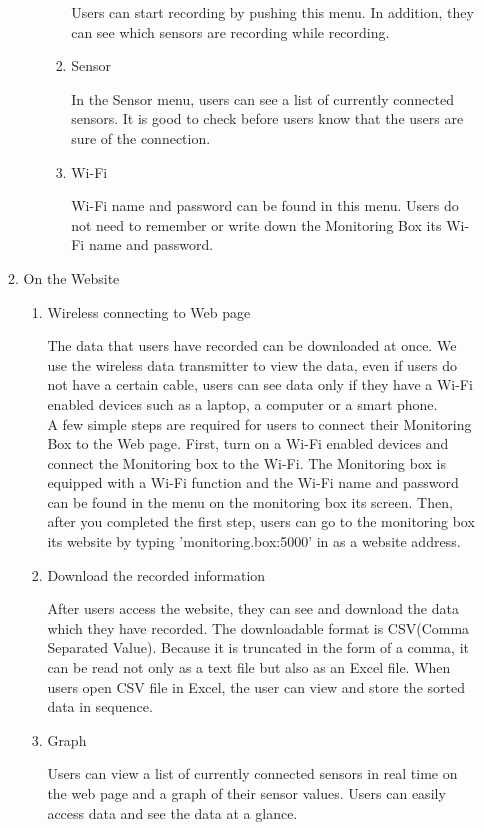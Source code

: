 \documentclass[conference]{IEEEtran}
\begin{document}
\begin{enumerate}
\begin{enumerate}
\begin{enumerate}
\begin{enumerate}
						Users can start recording by pushing this menu. In addition, they can see which sensors are recording while recording.\\
					\item Sensor

						In the Sensor menu, users can see a list of currently connected sensors. It is good to check before users know that the users are sure of the connection.\\
					\item Wi-Fi

						Wi-Fi name and password can be found in this menu. Users do not need to remember or write down the Monitoring Box its Wi-Fi name and password.\\
				\end{enumerate}
			\end{enumerate}
		\item On the Website
			\begin{enumerate}
				\item Wireless connecting to Web page

					The data that users have recorded can be downloaded at once. We use the wireless data transmitter to view the data, even if users do not have a certain cable, users can see data only if they have a Wi-Fi enabled devices such as a laptop, a computer or a smart phone. \\
					A few simple steps are required for users to connect their Monitoring Box to the Web page. First, turn on a Wi-Fi enabled devices and connect the Monitoring box to the Wi-Fi. The Monitoring box is equipped with a Wi-Fi function and the Wi-Fi name and password can be found in the menu on the monitoring box its screen. Then, after you completed the first step, users can go to the monitoring box its website by typing 'monitoring.box:5000' in as a website address.\\

				\item Download the recorded information

					After users access the website, they can see and download the data which they have recorded. The downloadable format is CSV(Comma Separated Value). Because it is truncated in the form of a comma, it can be read not only as a text file but also as an Excel file. When users open CSV file in Excel, the user can view and store the sorted data in sequence.\\

				\item Graph

					Users can view a list of currently connected sensors in real time on the web page and a graph of their sensor values. Users can easily access data and see the data at a glance.\\
			\end{enumerate}
		\end{enumerate}
 	\end{enumerate}
\end{document}
